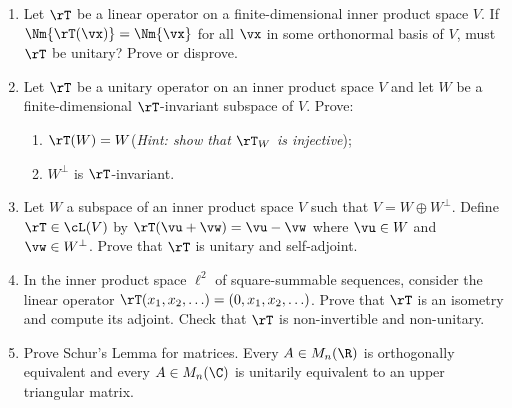 \begin{exercises}
\begin{enumerate}
  \item Let $\rT$ be a linear operator on a finite-dimensional inner product space $V$. If $\Nm{\rT(\vx)}=\Nm{\vx}$ for all $\vx$ in some orthonormal basis of $V$, must $\rT$ be unitary? Prove or disprove.
  
  \item Let $\rT$ be a unitary operator on an inner product space $V$ and let $W$ be a finite-dimensional $\rT$-invariant subspace of $V$. Prove:
  \begin{enumerate}
    \item $\rT(W)=W$\quad (\emph{Hint: show that $\at\rT W$ is injective});
    \item $W^\perp$ is $\rT$-invariant.
	\end{enumerate}
	
	\item Let $W$ a subspace of an inner product space $V$ such that $V=W\oplus W^\perp$. Define $\rT\in\cL(V)$ by $\rT(\vu+\vw)=\vu-\vw$ where $\vu\in W$ and $\vw\in W^\perp$. Prove that $\rT$ is unitary and self-adjoint.
	
	\item\label{ex:isometrynotunitary} In the inner product space $\ell^2$ of square-summable sequences, consider the linear operator
	$\rT(x_1,x_2,\ldots)=(0,x_1,x_2,\ldots)$. Prove that $\rT$ is an isometry and compute its adjoint. Check that $\rT$ is non-invertible and non-unitary.
	
	\item Prove Schur's Lemma for matrices. Every $A\in M_n(\R)$ is orthogonally equivalent and every $A\in M_n(\C)$ is unitarily equivalent to an upper triangular matrix. 
\end{enumerate}
\end{exercises}